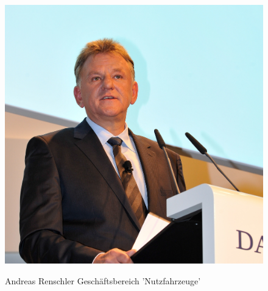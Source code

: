 \documentclass[12pt]{article}
\begin{document}
\begin{figure}[here!]
	\centering
	\begin{minipage}[h]{0.20\textwidth}
		\centering
		\includegraphics[width=1.0\textwidth]{images/AndreasRenschler.jpg}
		\label{fig:vorstandvw6}
		\cite{arpic}
	\end{minipage}
	\begin{minipage}[h]{0.10\textwidth}
		\hspace{1cm} 
	\end{minipage}
	\begin{minipage}[h]{0.65\textwidth}
		Andreas Renschler
		Geschäftsbereich 'Nutzfahrzeuge'
	\end{minipage}
\end{figure}
\end{document}

